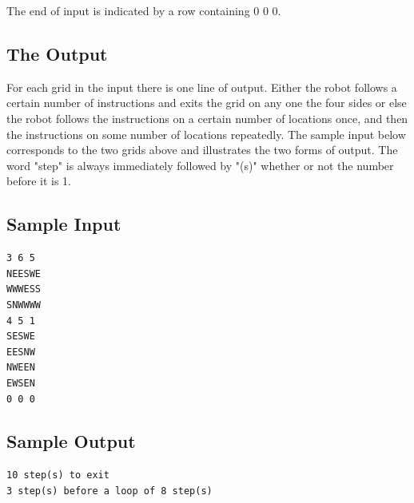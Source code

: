 The end of  input is indicated by a row containing 0 0 0.
 
\subsection*{The Output}

For each grid in the input there is one line of output.  Either the robot
follows a certain
number of  instructions and exits the grid on any one the four sides or
else the robot follows
the instructions on a certain number of locations once, and then the
instructions on some
number of locations repeatedly. The sample input below corresponds to the
two grids above
and illustrates the two forms of output.  
The word "step" is
always
immediately followed by "(s)" whether or not the number before it is 1.

\subsection*{Sample Input}
\begin{verbatim}
3 6 5
NEESWE
WWWESS
SNWWWW
4 5 1
SESWE
EESNW
NWEEN
EWSEN
0 0 0    
\end{verbatim}

\subsection*{Sample Output}
\begin{verbatim}
10 step(s) to exit
3 step(s) before a loop of 8 step(s) 
\end{verbatim}

